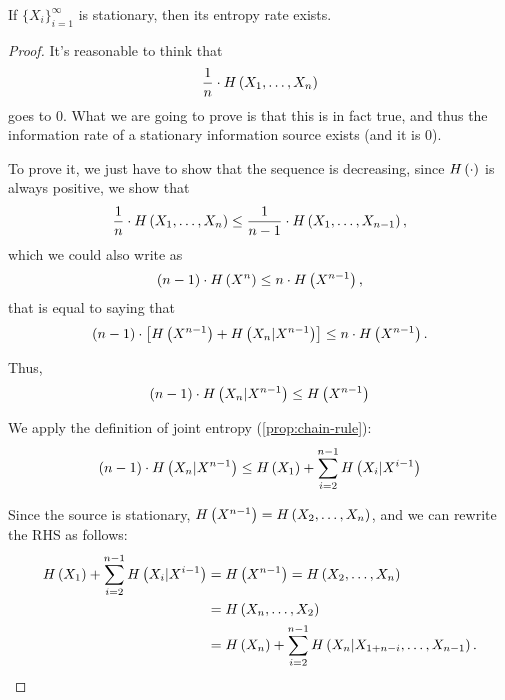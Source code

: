 \begin{thm}
	If $\{X_i\}_{i = 1}^\infty$ is stationary, then its entropy rate exists.
\end{thm}

\begin{proof}
	It's reasonable to think that
	\begin{equation*}
		\frac{1}{n} \cdot H\left({X_1, \dots, X_n}\right)
	\end{equation*}
	goes to 0.
	What we are going to prove is that this is in fact true, and thus the information rate of a stationary information source exists (and it is 0).

	To prove it, we just have to show that the sequence is decreasing, since $H\left({\cdot}\right)$ is always positive, \ie we show that
	\begin{equation*}
		\frac{1}{n} \cdot H\left({X_1, \dots, X_n}\right)
		\le
		\frac{1}{n-1} \cdot H\left({X_1, \dots, X_{n-1}}\right),
	\end{equation*}
	which we could also write as
	\begin{equation*}
		(n-1) \cdot H\left({X^n}\right)
		\le
		n \cdot H\left({X^{n-1}}\right),
	\end{equation*}
	that is equal to saying that
	\begin{equation*}
		(n-1) \cdot \left[ H\left({X^{n-1}}\right) + H\left({X_n | X^{n-1}}\right) \right]
		\le
		n \cdot H\left({X^{n-1}}\right).
	\end{equation*}

	Thus,
	\begin{equation*}
		(n-1) \cdot H\left({X_n | X^{n-1}}\right) \le H\left({X^{n-1}}\right)
	\end{equation*}

	We apply the definition of joint entropy (\cref{prop:chain-rule}):
	\begin{equation*}
		(n-1) \cdot H\left({X_n | X^{n-1}}\right)
		\le
		H\left({X_1}\right) + \sum_{i=2}^{n-1} H\left({X_i | X^{i-1}}\right)
	\end{equation*}

	Since the source is stationary, $H\left({X^{n-1}}\right) = H\left({X_2, \dots, X_n}\right)$, and we can rewrite the \ac{RHS} as follows:
	\begin{align*}
		H\left({X_1}\right) + \sum_{i=2}^{n-1} H\left({X_i | X^{i-1}}\right)
		& =
		H\left({X^{n-1}}\right)
		=
		H\left({X_2, \dots, X_{n}}\right)
		\\
		& =
		H\left({X_{n}, \dots, X_2}\right)
		\\
		& =
		H\left({X_n}\right) + \sum_{i=2}^{n-1} H\left({X_n | X_{1 + n - i}, \dots, X_{n-1}}\right).
	\end{align*}


\end{proof}

